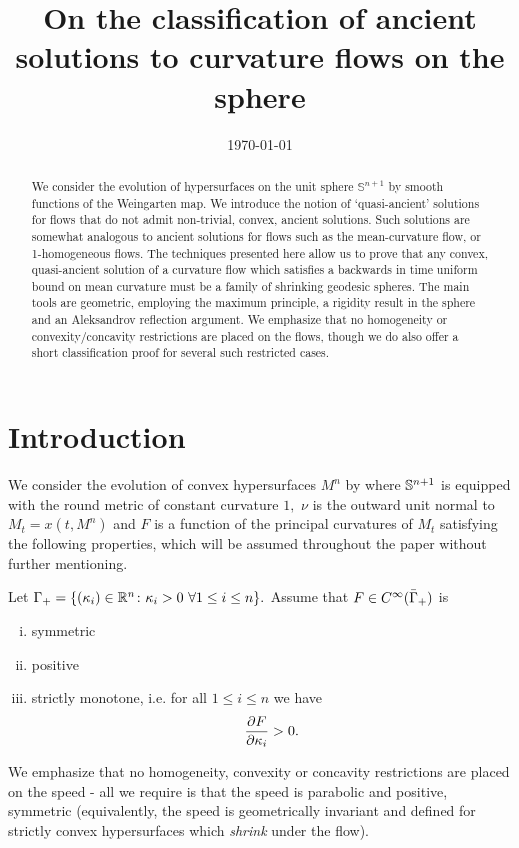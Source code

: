 \documentclass{amsart}
\begin{document}
\title[Ancient solutions to curvature flows in the sphere]
 {On the classification of ancient solutions to curvature flows on the sphere}

\curraddr{}
\email{}
\date{\today}

\dedicatory{}
\subjclass[2010]{}
\keywords{}

\begin{abstract}
We consider the evolution of hypersurfaces on the unit sphere $\mathbb{S}^{n+1}$ by smooth functions of the Weingarten map. We introduce the notion of `quasi-ancient' solutions for flows that do not admit non-trivial, convex, ancient solutions. Such solutions are somewhat analogous to ancient solutions for flows such as the mean-curvature flow, or 1-homogeneous flows. The techniques presented here allow us to prove that any convex, quasi-ancient solution of a curvature flow which satisfies a backwards in time uniform bound on mean curvature must be a family of shrinking geodesic spheres. The main tools are geometric, employing the maximum principle, a rigidity result in the sphere and an Aleksandrov reflection argument. We emphasize that no homogeneity or convexity/concavity restrictions are placed on the flows, though we do also offer a short classification proof for several such restricted cases.
\end{abstract}

\maketitle

\section{Introduction}
\label{sec:intro}

We consider the evolution of convex hypersurfaces $M^n$ by
where \(\S^{n+1}\) is equipped with the round metric of constant curvature $1,$ $\nu$ is the outward unit normal to $M_t=x(t,M^n)$ and $F$ is a function of the principal curvatures of $M_t$ satisfying the following properties, which will be assumed throughout the paper without further mentioning.
\begin{ass} \label{F}
Let $\G_{+}=\{(\k_i)\in\R^n\cn \k_i>0~\forall 1\leq i\leq n\}.$ Assume that $F\in C^{\8}(\-\G_{+})$ is
\begin{enumerate}[(i)]
\item{symmetric}
\item{positive}
\item{strictly monotone, i.e. for all $1\leq i\leq n$ we have
\[\fr{\del F}{\del \k_i}>0.\]}
\end{enumerate}
\end{ass}
We emphasize that no homogeneity, convexity or concavity restrictions are placed on the speed - all we require is that the speed is parabolic and positive, symmetric (equivalently, the speed is geometrically invariant and defined for strictly convex hypersurfaces which \emph{shrink} under the flow).
\end{document}
